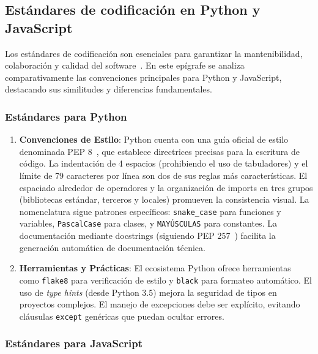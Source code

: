 \subsection{Estándares de codificación en Python y JavaScript}

Los estándares de codificación son esenciales para garantizar la mantenibilidad, colaboración y calidad del software~\cite{PEP8}. En este epígrafe se analiza comparativamente las convenciones principales para Python y JavaScript, destacando sus similitudes y diferencias fundamentales.

\subsubsection{Estándares para Python}

\begin{enumerate}
	\item \textbf{Convenciones de Estilo}: Python cuenta con una guía oficial de estilo denominada PEP 8~\cite{PEP8}, que establece directrices precisas para la escritura de código. La indentación de 4 espacios (prohibiendo el uso de tabuladores) y el límite de 79 caracteres por línea son dos de sus reglas más características. El espaciado alrededor de operadores y la organización de imports en tres grupos (bibliotecas estándar, terceros y locales) promueven la consistencia visual. La nomenclatura sigue patrones específicos: \texttt{snake\_case} para funciones y variables, \texttt{PascalCase} para clases, y \texttt{MAYÚSCULAS} para constantes. La documentación mediante docstrings (siguiendo PEP 257~\cite{PEP257}) facilita la generación automática de documentación técnica.
	\item \textbf{Herramientas y Prácticas}: El ecosistema Python ofrece herramientas como \texttt{flake8} para verificación de estilo y \texttt{black} para formateo automático. El uso de \textit{type hints} (desde Python 3.5) mejora la seguridad de tipos en proyectos complejos. El manejo de excepciones debe ser explícito, evitando cláusulas \texttt{except} genéricas que puedan ocultar errores.
\end{enumerate}

\subsubsection{Estándares para JavaScript}

